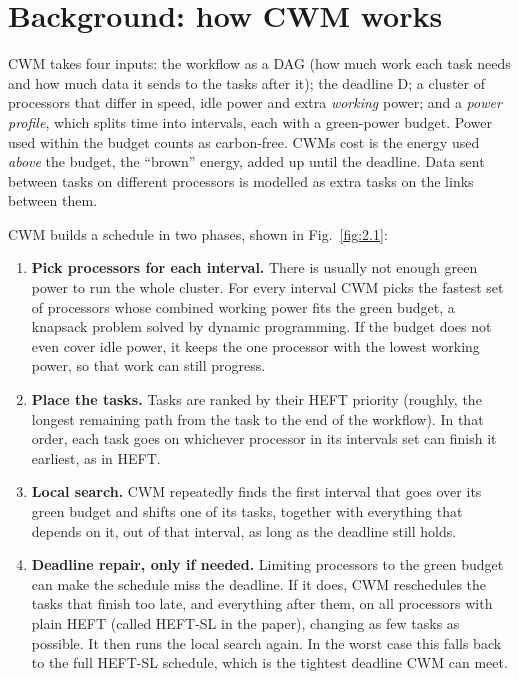 \documentclass[12pt,a4paper,oneside,openany]{report}
\begin{document}
\section{Background: how CWM works}\label{sec:2.2}

CWM takes four inputs: the workflow as a DAG (how much work each task
needs and how much data it sends to the tasks after it); the deadline D;
a cluster of processors that differ in speed, idle power and extra
\emph{working} power; and a \emph{power profile}, which splits time into
intervals, each with a green-power budget. Power used within the budget
counts as carbon-free. CWM\textquotesingle s cost is the energy used
\emph{above} the budget, the ``brown'' energy, added up until the
deadline. Data sent between tasks on different processors is modelled as
extra tasks on the links between them.

CWM builds a schedule in two phases, shown in Fig.~\ref{fig:2.1}:

\begin{enumerate}
\def\labelenumi{\arabic{enumi}.}
\item
  \textbf{Pick processors for each interval.} There is usually not
  enough green power to run the whole cluster. For every interval CWM
  picks the fastest set of processors whose combined working power fits
  the green budget, a knapsack problem solved by dynamic programming. If
  the budget does not even cover idle power, it keeps the one processor
  with the lowest working power, so that work can still progress.
\item
  \textbf{Place the tasks.} Tasks are ranked by their HEFT priority
  (roughly, the longest remaining path from the task to the end of the
  workflow). In that order, each task goes on whichever processor in its
  interval\textquotesingle s set can finish it earliest, as in HEFT.
\item
  \textbf{Local search.} CWM repeatedly finds the first interval that
  goes over its green budget and shifts one of its tasks, together with
  everything that depends on it, out of that interval, as long as the
  deadline still holds.
\item
  \textbf{Deadline repair, only if needed.} Limiting processors to the
  green budget can make the schedule miss the deadline. If it does, CWM
  reschedules the tasks that finish too late, and everything after them,
  on all processors with plain HEFT (called HEFT-SL in the paper),
  changing as few tasks as possible. It then runs the local search
  again. In the worst case this falls back to the full HEFT-SL schedule,
  which is the tightest deadline CWM can meet.
\end{enumerate}
\end{document}
